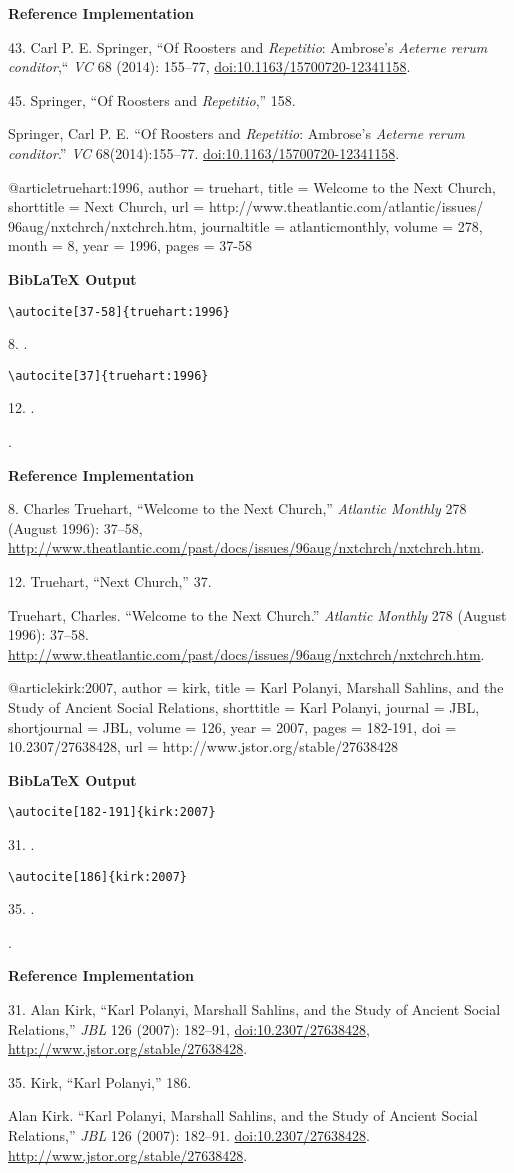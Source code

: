 \documentclass[a4paper]{article}
\newcommand\citetest[5]{%
  {\textbf{BibLaTeX Output}\par
   \nobreak
   \texttt{\textbackslash autocite[#2]\{#5\}}\par
   \color{biblatex-colour}
   #1. \cite[#2]{#5}.\par
   \color{black}
   \texttt{\textbackslash autocite[#4]\{#5\}}\par
   \color{biblatex-colour}
   #3. \cite[#4]{#5}.\par
   \hangindent\bibindent\bibentrycite{#5}.\par}}
\newenvironment{refimp}{%
  \begin{minipage}{\linewidth}
    \setlength{\parskip}{1ex}
    \textbf{Reference Implementation}\par
    \nobreak
    \color{reference-colour}
}{\end{minipage}}
\newenvironment{vb}{%
  \setlength{\parskip}{0pt}
  \verbatim}{\endverbatim}
\begin{document}
\begin{refimp}
  43. Carl P. E. Springer, “Of Roosters and \emph{Repetitio}: Ambrose’s
  \emph{Aeterne rerum conditor},“ \emph{VC} 68 (2014): 155–77,
  \url{doi:10.1163/15700720-12341158}.

  45. Springer, “Of Roosters and \emph{Repetitio},” 158.

  \hangindent\bibindent Springer, Carl P. E. “Of Roosters and
  \emph{Repetitio}: Ambrose’s \emph{Aeterne rerum conditor}.” \emph{VC}
  68(2014):155–77. \url{doi:10.1163/15700720-12341158}.
\end{refimp}

\begin{vb}
@article{truehart:1996,
  author = truehart,
  title = {Welcome to the Next Church},
  shorttitle = {Next Church},
  url = {http://www.theatlantic.com/atlantic/issues/
         96aug/nxtchrch/nxtchrch.htm},
  journaltitle = atlanticmonthly,
  volume = {278},
  month = {8},
  year = {1996},
  pages = {37-58}
}
\end{vb}

\citetest{8}{37-58}{12}{37}{truehart:1996}

\begin{refimp}
  8. Charles Truehart, “Welcome to the Next Church,” \emph{Atlantic Monthly}
  278 (August 1996): 37–58,
  \url{http://www.theatlantic.com/past/docs/issues/96aug/nxtchrch/nxtchrch.htm}.

  12. Truehart, “Next Church,” 37.
 
  \hangindent\bibindent Truehart, Charles. “Welcome to the Next Church.”
  \emph{Atlantic Monthly} 278 (August
  1996): 37–58.
  \url{http://www.theatlantic.com/past/docs/issues/96aug/nxtchrch/nxtchrch.htm}.
\end{refimp}

\begin{vb}
@article{kirk:2007,
  author = kirk,
  title = {Karl Polanyi, Marshall Sahlins, and the Study of
           Ancient Social Relations},
  shorttitle = {Karl Polanyi},
  journal = JBL,
  shortjournal = {JBL},
  volume = {126},
  year = {2007},
  pages = {182-191},
  doi = {10.2307/27638428},
  url = {http://www.jstor.org/stable/27638428}
}
\end{vb}

\citetest{31}{182-191}{35}{186}{kirk:2007}

\begin{refimp}
  31. Alan Kirk, “Karl Polanyi, Marshall Sahlins, and the Study of Ancient Social
  Relations,” \emph{JBL} 126 (2007): 182–91, \url{doi:10.2307/27638428},
  \url{http://www.jstor.org/stable/27638428}.

  35. Kirk, “Karl Polanyi,” 186.

  \hangindent\bibindent Alan Kirk. “Karl Polanyi, Marshall Sahlins, and the
  Study of Ancient Social Relations,” \emph{JBL} 126 (2007): 182–91.
  \url{doi:10.2307/27638428}. \url{http://www.jstor.org/stable/27638428}.
\end{refimp}
\end{document}
